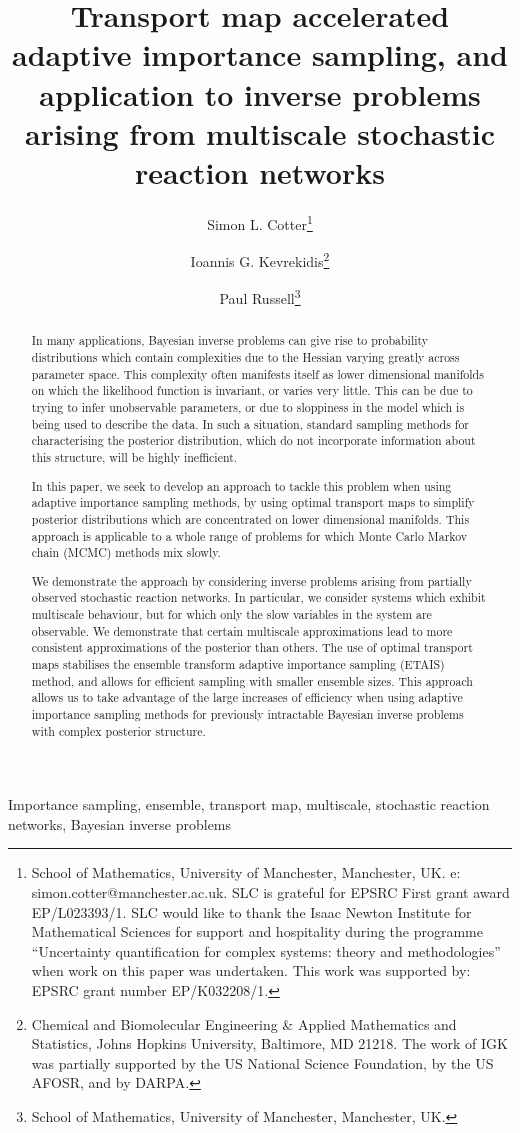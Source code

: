 \documentclass[final]{siamltex}
\author{Simon L. Cotter\thanks{School of
    Mathematics, University of Manchester, Manchester, UK. e:
    simon.cotter@manchester.ac.uk. SLC is grateful for EPSRC First
    grant award EP/L023393/1. SLC would like to thank the Isaac Newton
    Institute for Mathematical Sciences for support and hospitality
    during the programme ``Uncertainty quantification for complex systems: theory and methodologies'' when work on this paper was undertaken. This work was supported by:
EPSRC grant number EP/K032208/1.} \and Ioannis
G. Kevrekidis\thanks{Chemical and Biomolecular Engineering \& Applied
  Mathematics and Statistics, Johns Hopkins University, Baltimore, MD
  21218. The work of IGK was partially supported by the US National
  Science Foundation, by the US AFOSR, and by DARPA.} \and Paul
  Russell\thanks{School of
    Mathematics, University of Manchester, Manchester, UK.}}
\title{Transport map accelerated adaptive importance sampling, and application to inverse problems arising from
  multiscale stochastic reaction networks}
\newcommand{\edit}[1]{{\color{red} #1}}
\begin{document}
\maketitle
\begin{abstract}
In many applications, Bayesian inverse problems can give rise to
probability distributions which contain complexities due to the
Hessian varying greatly across parameter space. This complexity often manifests itself as lower
dimensional manifolds on which the likelihood function is
invariant, or varies very little. This can be due to trying to infer
unobservable parameters, or due to sloppiness in the model which is
being used to describe the data. In such a situation, standard
sampling methods for characterising the posterior distribution, which
do not incorporate information about this structure, will be highly
inefficient. 

In this paper, we seek to develop an approach to
tackle this problem when using adaptive importance sampling methods,
by using optimal transport maps to simplify
posterior distributions which are concentrated on lower dimensional
manifolds. This approach is applicable to a whole range of
problems for which Monte Carlo Markov chain (MCMC) methods mix slowly.

We demonstrate the approach by considering inverse problems arising
from partially observed stochastic reaction networks. In particular,
we consider systems which exhibit multiscale behaviour, but for which
only the slow variables in the system are observable. We demonstrate
that certain multiscale approximations lead to more consistent
approximations of the posterior than others. The use of optimal
transport maps stabilises the ensemble transform adaptive importance
sampling (ETAIS) method, and allows for efficient sampling with
smaller ensemble sizes. \edit{This approach allows us to take
  advantage of the large increases of efficiency when using adaptive
  importance sampling methods for previously intractable Bayesian
  inverse problems with complex posterior structure.}
\end{abstract}
\begin{keywords}Importance sampling, ensemble, transport map,
  multiscale, stochastic reaction networks, Bayesian inverse problems
\end{keywords}
\end{document}
